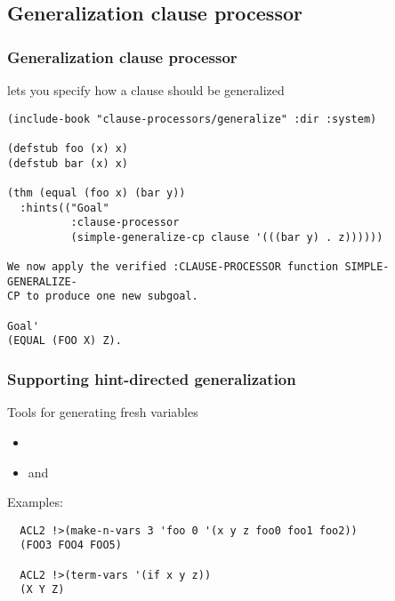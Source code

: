 \subsection{Generalization clause processor}

\begin{frame}[fragile] 
\frametitle{Generalization clause processor}

 lets you specify how a clause should be
generalized

{\footnotesize \begin{verbatim}
(include-book "clause-processors/generalize" :dir :system)

(defstub foo (x) x)
(defstub bar (x) x)

(thm (equal (foo x) (bar y))
  :hints(("Goal"
          :clause-processor
          (simple-generalize-cp clause '(((bar y) . z))))))

We now apply the verified :CLAUSE-PROCESSOR function SIMPLE-GENERALIZE-
CP to produce one new subgoal.

Goal'
(EQUAL (FOO X) Z).
\end{verbatim}}
\end{frame}

\begin{frame}[fragile] 
\frametitle{Supporting hint-directed generalization}

Tools for generating fresh variables
\begin{itemize}
\item {}
\item {} and 
\end{itemize}

\SmallSkip
Examples:
\begin{verbatim}
  ACL2 !>(make-n-vars 3 'foo 0 '(x y z foo0 foo1 foo2))
  (FOO3 FOO4 FOO5)

  ACL2 !>(term-vars '(if x y z))
  (X Y Z)
\end{verbatim}

\end{frame}
